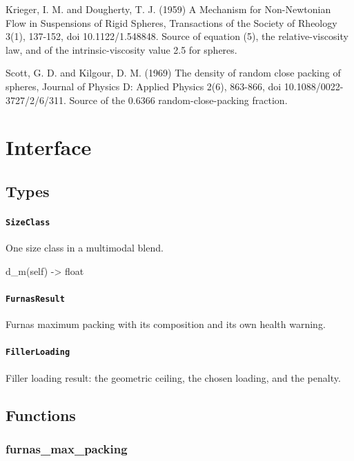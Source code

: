 \documentclass[10pt,a4paper,twoside]{report}
\begin{document}
Krieger, I. M. and Dougherty, T. J. (1959) A Mechanism for Non-Newtonian Flow in Suspensions of Rigid Spheres, Transactions of the Society of Rheology 3(1), 137-152, doi 10.1122/1.548848. Source of equation (5), the relative-viscosity law, and of the intrinsic-viscosity value 2.5 for spheres.

Scott, G. D. and Kilgour, D. M. (1969) The density of random close packing of spheres, Journal of Physics D: Applied Physics 2(6), 863-866, doi 10.1088/0022-3727/2/6/311. Source of the 0.6366 random-close-packing fraction.

\section{Interface}

\subsection*{Types}

\paragraph{\texttt{SizeClass}}

One size class in a multimodal blend.

\begin{verbatimsmall}
d_m(self) -> float
\end{verbatimsmall}

\paragraph{\texttt{FurnasResult}}

Furnas maximum packing with its composition and its own health warning.

\paragraph{\texttt{FillerLoading}}

Filler loading result: the geometric ceiling, the chosen loading, and the penalty.

\subsection*{Functions}

\subsubsection*{furnas\_max\_packing}
\end{document}
